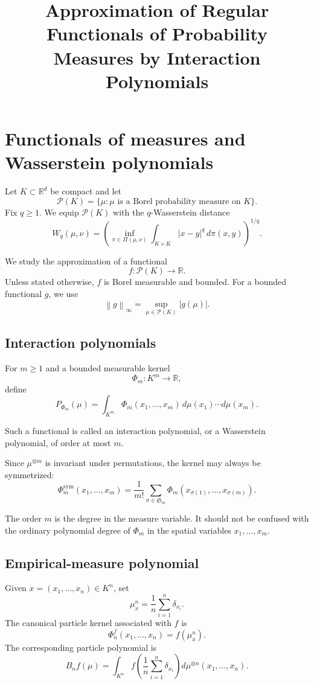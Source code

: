 \documentclass[11pt]{article}
\title{Approximation of Regular Functionals of Probability Measures
by Interaction Polynomials}
\author{}
\date{}
\newcommand{\Pcal}{\mathcal P}
\newcommand{\R}{\mathbb R}
\newcommand{\norm}[1]{\left\lVert #1\right\rVert}
\begin{document}
\maketitle

\section{Functionals of measures and Wasserstein polynomials}

Let \(K\subset\R^d\) be compact and let
\[
\Pcal(K)=\{\mu:\mu \text{ is a Borel probability measure on }K\}.
\]
Fix \(q\geq1\). We equip \(\Pcal(K)\) with the \(q\)-Wasserstein distance
\[
W_q(\mu,\nu)
=
\left(
\inf_{\pi\in\Pi(\mu,\nu)}
\int_{K\times K}|x-y|^q\,d\pi(x,y)
\right)^{1/q}.
\]

We study the approximation of a functional
\[
f:\Pcal(K)\longrightarrow\R.
\]
Unless stated otherwise, \(f\) is Borel measurable and bounded. For a
bounded functional \(g\), we use
\[
\norm{g}_\infty
=
\sup_{\mu\in\Pcal(K)}|g(\mu)|.
\]

\subsection{Interaction polynomials}

For \(m\geq 1\) and a bounded measurable kernel
\[
\Phi_m:K^m\longrightarrow\R,
\]
define
\[
P_{\Phi_m}(\mu)
=
\int_{K^m}
\Phi_m(x_1,\ldots,x_m)\,
d\mu(x_1)\cdots d\mu(x_m).
\]

Such a functional is called an interaction polynomial, or a Wasserstein
polynomial, of order at most \(m\).

Since \(\mu^{\otimes m}\) is invariant under permutations, the kernel may
always be symmetrized:
\[
\Phi_m^{\mathrm{sym}}(x_1,\ldots,x_m)
=
\frac1{m!}\sum_{\sigma\in\mathfrak S_m}
\Phi_m(x_{\sigma(1)},\ldots,x_{\sigma(m)}).
\]

The order \(m\) is the degree in the measure variable. It should not be
confused with the ordinary polynomial degree of \(\Phi_m\) in the spatial
variables \(x_1,\ldots,x_m\).

\subsection{Empirical-measure polynomial}

Given \(x=(x_1,\ldots,x_n)\in K^n\), set
\[
\mu_x^n=\frac1n\sum_{i=1}^n\delta_{x_i}.
\]
The canonical particle kernel associated with \(f\) is
\[
\Phi_n^f(x_1,\ldots,x_n)
=
f\left(\mu_x^n\right).
\]
The corresponding particle polynomial is
\[
B_nf(\mu)
=
\int_{K^n}
f\left(\frac1n\sum_{i=1}^n\delta_{x_i}\right)
d\mu^{\otimes n}(x_1,\ldots,x_n).
\]
\end{document}
